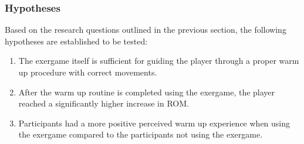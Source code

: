 \subsubsection{Hypotheses}
Based on the research questions outlined in the previous section, the following hypotheses are established to be tested: 
\begin{enumerate}
\item The exergame itself is sufficient for guiding the player through a proper warm up procedure with correct movements. 
\item After the warm up routine is completed using the exergame, the player reached a significantly higher increase in ROM.
\item Participants had a more positive perceived warm up experience when using the exergame compared to the participants not using the exergame.  
\end{enumerate}

